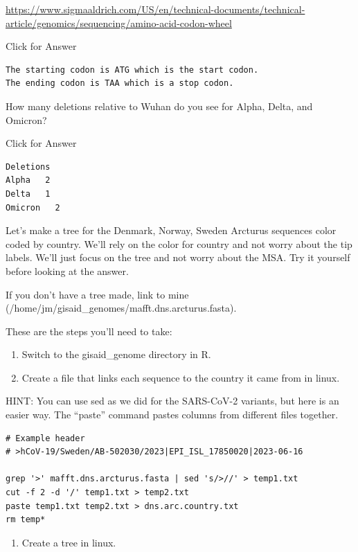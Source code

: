 \documentclass[
]{book}
\providecommand{\tightlist}{%
  \setlength{\itemsep}{0pt}\setlength{\parskip}{0pt}}
\begin{document}
\url{https://www.sigmaaldrich.com/US/en/technical-documents/technical-article/genomics/sequencing/amino-acid-codon-wheel}

Click for Answer

\begin{verbatim}
The starting codon is ATG which is the start codon.
The ending codon is TAA which is a stop codon.
\end{verbatim}

\hfill\break

How many deletions relative to Wuhan do you see for Alpha, Delta, and Omicron?

Click for Answer

\begin{verbatim}
Deletions
Alpha   2
Delta   1
Omicron   2
\end{verbatim}

\hfill\break

Let's make a tree for the Denmark, Norway, Sweden Arcturus sequences color coded by country. We'll rely on the color for country and not worry about the tip labels. We'll just focus on the tree and not worry about the MSA. Try it yourself before looking at the answer.

If you don't have a tree made, link to mine (/home/jm/gisaid\_genomes/mafft.dns.arcturus.fasta).

These are the steps you'll need to take:

\begin{enumerate}
\def\labelenumi{\arabic{enumi}.}
\tightlist
\item
  Switch to the gisaid\_genome directory in R.
\item
  Create a file that links each sequence to the country it came from in linux.
\end{enumerate}

HINT: You can use sed as we did for the SARS-CoV-2 variants, but here is an easier way. The ``paste'' command pastes columns from different files together.

\begin{verbatim}
# Example header
# >hCoV-19/Sweden/AB-502030/2023|EPI_ISL_17850020|2023-06-16

grep '>' mafft.dns.arcturus.fasta | sed 's/>//' > temp1.txt
cut -f 2 -d '/' temp1.txt > temp2.txt
paste temp1.txt temp2.txt > dns.arc.country.txt
rm temp*
\end{verbatim}

\begin{enumerate}
\def\labelenumi{\arabic{enumi}.}
\setcounter{enumi}{2}
\tightlist
\item
  Create a tree in linux.
\end{enumerate}
\end{document}
